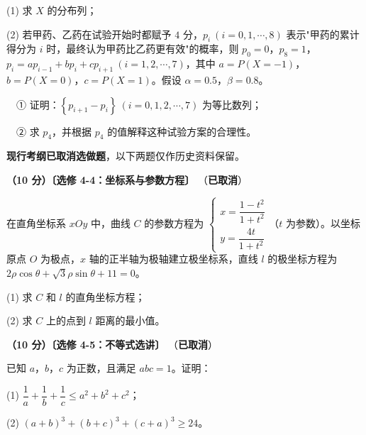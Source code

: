   (1) 求 $X$ 的分布列；

  (2) 若甲药、乙药在试验开始时都赋予 $4$ 分，$p_i\ (i=0,1,\cdots,8)$ 表示"甲药的累计得分为 $i$ 时，最终认为甲药比乙药更有效"的概率，则 $p_0=0$，$p_8=1$，$p_i=ap_{i-1}+bp_i+cp_{i+1}\ (i=1,2,\cdots,7)$，其中 $a=P(X=-1)$，$b=P(X=0)$，$c=P(X=1)$。假设 $\alpha=0.5$，$\beta=0.8$。

  　① 证明：$\left\{p_{i+1}-p_i\right\}\ (i=0,1,2,\cdots,7)$ 为等比数列；

  　② 求 $p_4$，并根据 $p_4$ 的值解释这种试验方案的合理性。

\par\medskip


\begin{gktip}
\textbf{ 现行考纲已取消选做题}，以下两题仅作历史资料保留。
\end{gktip}

\textbf{（10 分）〔选修 4-4：坐标系与参数方程〕} （\textbf{已取消}）

在直角坐标系 $xOy$ 中，曲线 $C$ 的参数方程为 $\begin{cases}x=\dfrac{1-t^{2}}{1+t^{2}}\\[2mm] y=\dfrac{4t}{1+t^{2}}\end{cases}$（$t$ 为参数）。以坐标原点 $O$ 为极点，$x$ 轴的正半轴为极轴建立极坐标系，直线 $l$ 的极坐标方程为 $2\rho\cos\theta+\sqrt3\rho\sin\theta+11=0$。

  (1) 求 $C$ 和 $l$ 的直角坐标方程；

  (2) 求 $C$ 上的点到 $l$ 距离的最小值。

\textbf{（10 分）〔选修 4-5：不等式选讲〕} （\textbf{已取消}）

已知 $a$，$b$，$c$ 为正数，且满足 $abc=1$。证明：

  (1) $\dfrac1a+\dfrac1b+\dfrac1c\le a^{2}+b^{2}+c^{2}$；

  (2) $(a+b)^{3}+(b+c)^{3}+(c+a)^{3}\ge24$。

\par\medskip

